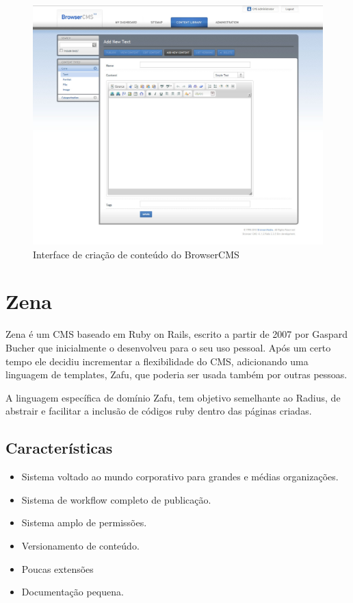 \begin{figure}[here]
\includegraphics[width=150mm]{images/browser_cms_new_content.jpg}
\caption{Interface de criação de conteúdo do BrowserCMS}
\label{fig:browsercms_new_content.png}
\end{figure}


\section{Zena}

Zena é um CMS baseado em Ruby on Rails, escrito a partir de 2007 por Gaspard Bucher que inicialmente o desenvolveu para o seu uso pessoal. Após um certo tempo ele decidiu incrementar a flexibilidade do CMS, adicionando uma linguagem de templates, Zafu, que poderia ser usada também por outras pessoas.

A linguagem específica de domínio Zafu, tem objetivo semelhante ao Radius, de abstrair e facilitar a inclusão de códigos ruby dentro das páginas criadas.


\subsection{Características}

\begin{itemize}
  \item Sistema voltado ao mundo corporativo para grandes e médias organizações.
  \item Sistema de workflow completo de publicação.
  \item Sistema amplo de permissões.
  \item Versionamento de conteúdo.
  \item Poucas extensões 
  \item Documentação pequena.
\end{itemize}

